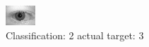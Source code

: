 \begin{figure}[h!]
\begin{center}
\includegraphics[width=0.60\columnwidth]{figures/ID663_class_2_target_3.png}
\end{center}
\caption{ Classification: 2 actual target: 3}
\label{fig:ID663_class_2_target_3}
\end{figure}
